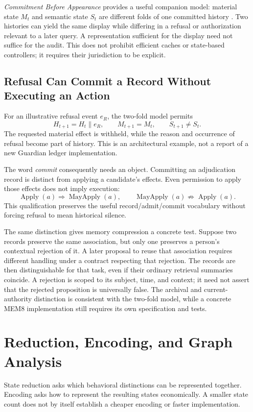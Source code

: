 \documentclass[11pt]{article}
\begin{document}
\emph{Commitment Before Appearance} provides a useful companion model: material state $M_t$ and semantic state $S_t$ are different folds of one committed history \cite{flyxion-folds}. Two histories can yield the same display while differing in a refusal or authorization relevant to a later query. A representation sufficient for the display need not suffice for the audit. This does not prohibit efficient caches or state-based controllers; it requires their jurisdiction to be explicit.

\subsection{Refusal Can Commit a Record Without Executing an Action}
For an illustrative refusal event $e_R$, the two-fold model permits
\[
H_{t+1}=H_t\mathbin{\|}e_R,\qquad
M_{t+1}=M_t,\qquad S_{t+1}\ne S_t.
\]
The requested material effect is withheld, while the reason and occurrence of refusal become part of history. This is an architectural example, not a report of a new Guardian ledger implementation.

The word \emph{commit} consequently needs an object. Committing an adjudication record is distinct from applying a candidate's effects. Even permission to apply those effects does not imply execution:
\[
\operatorname{Apply}(a)\Rightarrow\operatorname{MayApply}(a),
\qquad
\operatorname{MayApply}(a)\not\Rightarrow\operatorname{Apply}(a).
\]
This qualification preserves the useful record/admit/commit vocabulary without forcing refusal to mean historical silence.

The same distinction gives memory compression a concrete test. Suppose two records preserve the same association, but only one preserves a person's contextual rejection of it. A later proposal to reuse that association requires different handling under a contract respecting that rejection. The records are then distinguishable for that task, even if their ordinary retrieval summaries coincide. A rejection is scoped to its subject, time, and context; it need not assert that the rejected proposition is universally false. The archival and current-authority distinction is consistent with the two-fold model, while a concrete MEM8 implementation still requires its own specification and tests.

\section{Reduction, Encoding, and Graph Analysis}
State reduction asks which behavioral distinctions can be represented together. Encoding asks how to represent the resulting states economically. A smaller state count does not by itself establish a cheaper encoding or faster implementation.
\end{document}
